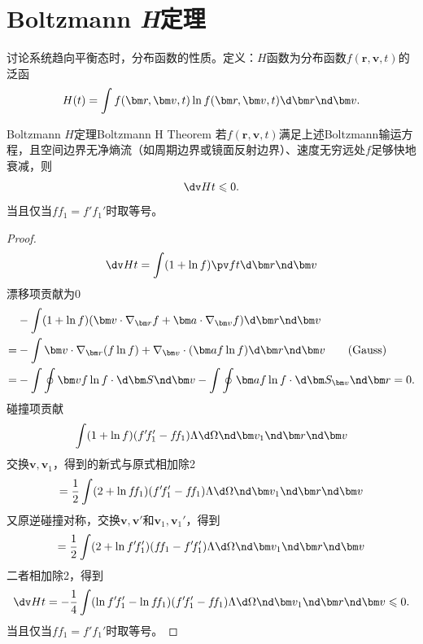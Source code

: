 \section{Boltzmann \textit{H}定理}
讨论系统趋向平衡态时，分布函数的性质。定义：$H$函数为分布函数$f(\bm r,\bm v,t)$的泛函
\begin{align}
	H(t)=\int f(\bm r,\bm v,t)\ln f(\bm r,\bm v,t)\d\bm r\nd\bm v.
\end{align}
\begin{theorem}{Boltzmann $H$定理}{Boltzmann H Theorem}
	若$f(\bm r,\bm v,t)$满足上述Boltzmann输运方程，且空间边界无净熵流（如周期边界或镜面反射边界）、速度无穷远处$f$足够快地衰减，则
	\begin{align}
		\dv Ht\leqslant 0.
	\end{align}
	当且仅当$f\!f_1=f'\!f_1'$时取等号。
\end{theorem}
\begin{proof}
	\begin{align*}
		\dv Ht=\int(1+\ln f)\pv ft\d\bm r\nd\bm v
	\end{align*}
	漂移项贡献为0
	\begin{align*}
		&-\int(1+\ln f)(\bm v\cdot\nabla_{\bm r}f+\bm a\cdot\nabla_{\bm v}f)\d\bm r\nd\bm v\\
		=&-\int\bm v\cdot\nabla_{\bm r}(f\ln f)+\nabla_{\bm v}\cdot(\bm af\ln f)\d\bm r\nd\bm v\tag{Gauss}\\
		=&-\int\oint \bm v f\ln f\cdot\d\bm S\nd\bm v-\int\oint\bm af\ln f\cdot\d\bm S_{\bm v}\nd\bm r=0.
	\end{align*}
	碰撞项贡献
	\begin{align*}
		\int (1+\ln f)(f'\!f_1'-f\!f_1)\Lambda\d\Omega\nd\bm v_1\nd\bm r\nd\bm v
	\end{align*}
	交换$\bm v,\bm v_1$，得到的新式与原式相加除2
	\[
		=\frac12\int (2+\ln f\!f_1)(f'\!f_1'-f\!f_1)\Lambda\d\Omega\nd\bm v_1\nd\bm r\nd\bm v
	\]
	又原逆碰撞对称，交换$\bm v,\bm v'$和$\bm v_1,\bm v_1'$，得到
	\[
		=\frac12\int (2+\ln f'\!f_1')(f\!f_1-f'\!f_1')\Lambda\d\Omega\nd\bm v_1\nd\bm r\nd\bm v
	\]
	二者相加除2，得到
	\begin{align}
		\dv Ht=-\frac14\int (\ln f'\!f_1'-\ln f\!f_1)(f'\!f_1'-f\!f_1)\Lambda\d\Omega\nd\bm v_1\nd\bm r\nd\bm v\leqslant 0.
	\end{align}
	当且仅当$f\!f_1=f'\!f_1'$时取等号。
\end{proof}

